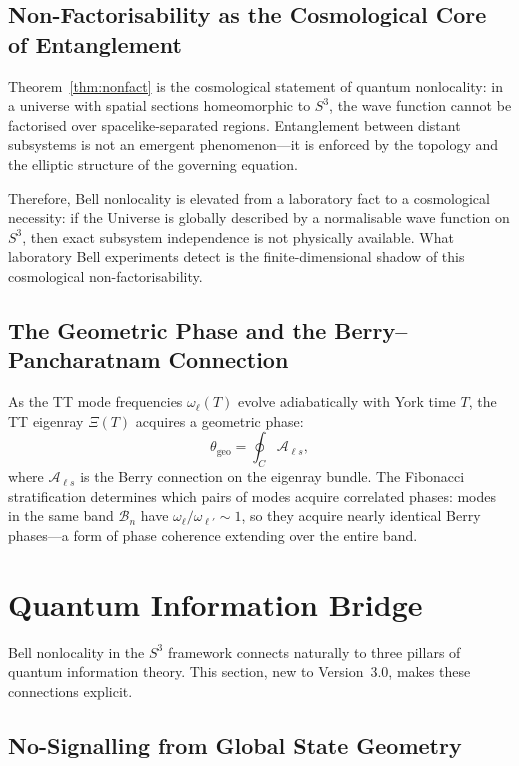 \documentclass[12pt,a4paper]{article}
\theoremstyle{definition}
\theoremstyle{remark}
\begin{document}
\subsection{Non-Factorisability as the Cosmological Core of Entanglement}

Theorem~\ref{thm:nonfact} is the cosmological statement of quantum nonlocality: in
a universe with spatial sections homeomorphic to $S^3$, the wave function cannot be
factorised over spacelike-separated regions. Entanglement between distant subsystems
is not an emergent phenomenon---it is enforced by the topology and the elliptic
structure of the governing equation.

Therefore, Bell nonlocality is elevated from a laboratory fact to a cosmological
necessity: if the Universe is globally described by a normalisable wave function on
$S^3$, then exact subsystem independence is not physically available. What laboratory
Bell experiments detect is the finite-dimensional shadow of this cosmological
non-factorisability.

\subsection{The Geometric Phase and the Berry--Pancharatnam Connection}

As the TT mode frequencies $\omega_\ell(T)$ evolve adiabatically with York time $T$,
the TT eigenray $\Xi(T)$ acquires a geometric phase:
\[
\theta_{\mathrm{geo}} = \oint_C \mathcal{A}_{\ell s},
\]
where $\mathcal{A}_{\ell s}$ is the Berry connection on the eigenray bundle. The
Fibonacci stratification determines which pairs of modes acquire correlated phases:
modes in the same band $\mathcal{B}_n$ have $\omega_\ell/\omega_{\ell'}\sim 1$, so
they acquire nearly identical Berry phases---a form of phase coherence extending over
the entire band.

\section{Quantum Information Bridge}
\label{sec:qinfo}

Bell nonlocality in the $S^3$ framework connects naturally to three pillars of
quantum information theory. This section, new to Version~3.0, makes these connections
explicit.

\subsection{No-Signalling from Global State Geometry}
\end{document}

